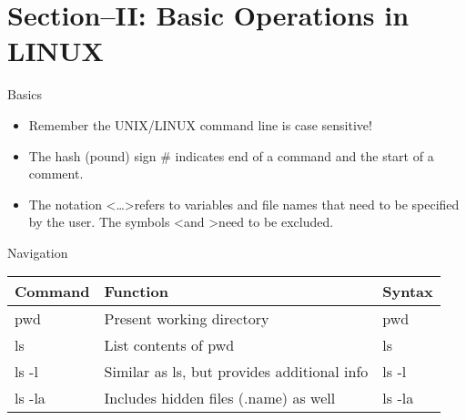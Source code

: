 

\maketitle
\section{Section--II: Basic Operations in LINUX	}
\begin{frame}[t]{Basics}
	\begin{itemize}
		\item  Remember the UNIX/LINUX command line is case sensitive!
		\item The hash (pound) sign \# indicates end of a command and 
		the start of a comment.
		\item The notation \textless \dots \textgreater refers to variables 
		and file names that need to be specified by the user. The symbols 
		\textless  and \textgreater need to be excluded.
	\end{itemize}
\end{frame}


\begin{frame}[t]{Navigation}\hfill
\begin{center}
	\begin{tabular}{lll} 
		\textbf{Command} & \textbf{Function} & \textbf{Syntax} \\ 
		\hline
		pwd & Present working directory & \color{red} \textdollar pwd \\ 
		ls & List contents of pwd &  \color{red} \textdollar ls  \\ 
		ls -l & Similar as ls, but provides additional info &  \color{red} 
		\textdollar ls -l \\ 
		ls -la & Includes hidden files (.name) as well &  \color{red} 
		\textdollar ls -la \\ 
	
	\end{tabular}
\end{center}
\end{frame}



